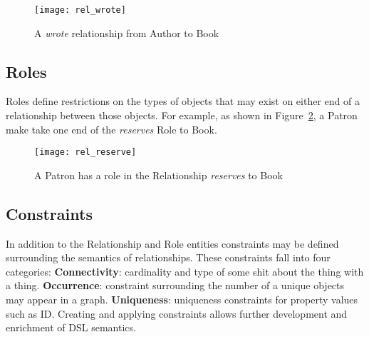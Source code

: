 \begin{figure}[H]
  \centering
  \texttt{[image: rel\_wrote]}
  \caption{A \emph{wrote} relationship from Author to Book}
  \label{fig:authrel}
\end{figure}


\subsection{Roles}
Roles define restrictions on the types of objects that may exist on either end of a relationship between those objects. For example, as shown in Figure~\ref{fig:resrole}, a Patron make take one end of the \emph{reserves} Role to Book.

\begin{figure}[H]
  \centering
  \texttt{[image: rel\_reserve]}
  \caption{A Patron has a role in the Relationship \emph{reserves} to Book}
  \label{fig:resrole}
\end{figure}

\subsection{Constraints}
In addition to the Relationship and Role entities constraints may be defined surrounding the semantics of relationships. These constraints fall into four categories:\newline
\textbf{Connectivity}: cardinality and type of some shit about the thing with a thing. \newline
\textbf{Occurrence}: constraint surrounding the number of a unique objects may appear in a graph.\newline
\textbf{Uniqueness}: uniqueness constraints for property values such as ID.\newline
Creating and applying constraints allows further development and enrichment of DSL semantics.


